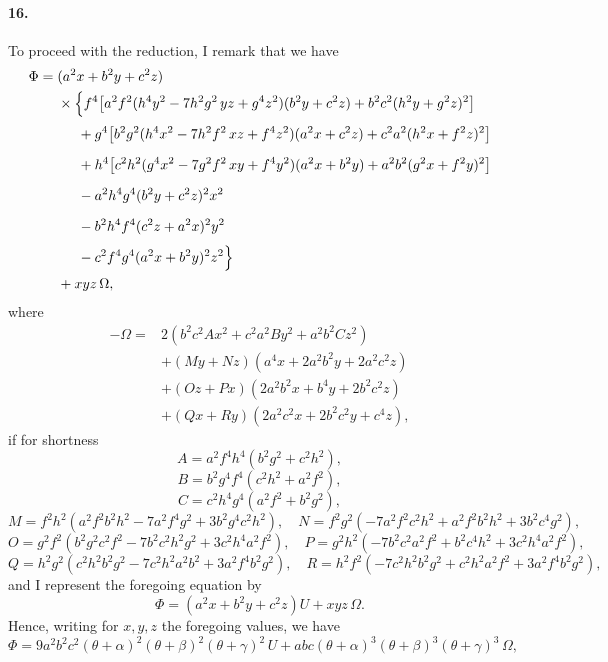 \documentclass[11pt,a4paper]{article}
\begin{document}
\paragraph{16.}
To proceed with the reduction, I remark that we have
\[
\begin{aligned}
\Phi = {}& (a^2 x + b^2 y + c^2 z)\\
& \times \Bigl\{ f^4 \bigl[ a^2 f^2 (h^4 y^2 - 7 h^2 g^2 \, yz + g^4 z^2)(b^2 y + c^2 z) + b^2 c^2 (h^2 y + g^2 z)^2 \bigr] \\
& \phantom{\times \Bigl\{} + g^4 \bigl[ b^2 g^2 (h^4 x^2 - 7 h^2 f^2 \, xz + f^4 z^2)(a^2 x + c^2 z) + c^2 a^2 (h^2 x + f^2 z)^2 \bigr] \\
& \phantom{\times \Bigl\{} + h^4 \bigl[ c^2 h^2 (g^4 x^2 - 7 g^2 f^2 \, xy + f^4 y^2)(a^2 x + b^2 y) + a^2 b^2 (g^2 x + f^2 y)^2 \bigr] \\
& \phantom{\times \Bigl\{} - a^2 h^4 g^4 (b^2 y + c^2 z)^2 x^2 \\
& \phantom{\times \Bigl\{} - b^2 h^4 f^4 (c^2 z + a^2 x)^2 y^2 \\
& \phantom{\times \Bigl\{} - c^2 f^4 g^4 (a^2 x + b^2 y)^2 z^2 \Bigr\} \\
& + xyz \, \Omega,
\end{aligned}
\]
where
\[
\begin{aligned}
- \Omega = {}& 2 (b^2 c^2 A x^2 + c^2 a^2 B y^2 + a^2 b^2 C z^2) \\
& + (My + Nz)(a^4 x + 2 a^2 b^2 y + 2 a^2 c^2 z) \\
& + (Oz + Px)(2 a^2 b^2 x + b^4 y + 2 b^2 c^2 z) \\
& + (Qx + Ry)(2 a^2 c^2 x + 2 b^2 c^2 y + c^4 z),
\end{aligned}
\]
if for shortness
\[
A = a^2 f^4 h^4 (b^2 g^2 + c^2 h^2),
\]
\[
B = b^2 g^4 f^4 (c^2 h^2 + a^2 f^2),
\]
\[
C = c^2 h^4 g^4 (a^2 f^2 + b^2 g^2),
\]
\[
M = f^2 h^2 (a^2 f^2 b^2 h^2 - 7 a^2 f^4 g^2 + 3 b^2 g^4 c^2 h^2),\quad
N = f^2 g^2 (- 7 a^2 f^2 c^2 h^2 + a^2 f^2 b^2 h^2 + 3 b^2 c^4 g^2),
\]
\[
O = g^2 f^2 (b^2 g^2 c^2 f^2 - 7 b^2 c^2 h^2 g^2 + 3 c^2 h^4 a^2 f^2),\quad
P = g^2 h^2 (- 7 b^2 c^2 a^2 f^2 + b^2 c^4 h^2 + 3 c^2 h^4 a^2 f^2),
\]
\[
Q = h^2 g^2 (c^2 h^2 b^2 g^2 - 7 c^2 h^2 a^2 b^2 + 3 a^2 f^4 b^2 g^2),\quad
R = h^2 f^2 (- 7 c^2 h^2 b^2 g^2 + c^2 h^2 a^2 f^2 + 3 a^2 f^4 b^2 g^2),
\]
and I represent the foregoing equation by
\[
\Phi = (a^2 x + b^2 y + c^2 z) U + xyz \, \Omega.
\]
Hence, writing for $x, y, z$ the foregoing values, we have
\[
\Phi = 9 a^2 b^2 c^2 (\theta + \alpha)^2 (\theta + \beta)^2 (\theta + \gamma)^2 \, U
 + abc (\theta + \alpha)^3 (\theta + \beta)^3 (\theta + \gamma)^3 \, \Omega,
\]
\end{document}
